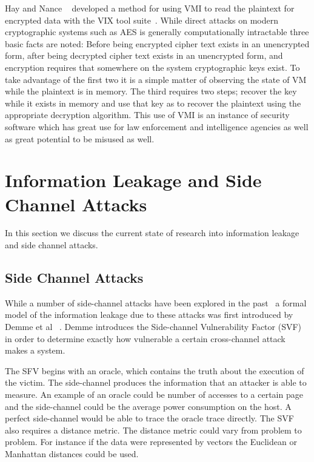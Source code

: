 Hay and Nance ~\cite{hay_circumventing_2012} developed a method for using VMI to read the plaintext for encrypted data with the VIX tool suite~\cite{hay_forensics_2008}.  While direct attacks on modern cryptographic systems such as AES is generally computationally intractable three basic facts are noted: Before being encrypted cipher text exists in an unencrypted form, after being decrypted cipher text exists in an unencrypted form, and encryption requires that somewhere on the system cryptographic keys exist. To take advantage of the first two it is a simple matter of observing the state of VM while the plaintext is in memory.  The third requires two steps; recover the key while it exists in memory and use that key as to recover the plaintext using the appropriate decryption algorithm. This use of VMI is an instance of security software which has great use for law enforcement and intelligence agencies as well as great potential to be misused as well.

\section{Information Leakage and Side Channel Attacks}

In this section we discuss the current state of research into information leakage and side channel attacks.

\subsection{Side Channel Attacks}
While a number of side-channel attacks have been explored in the past~\cite{yu_approach_2013,ristenpart_hey_2009, zhang_cross-vm_2012} a formal model of the information leakage due to these attacks was first introduced by Demme et al ~\cite{demme2012side}. Demme introduces the Side-channel Vulnerability Factor (SVF) in order to determine exactly how vulnerable a certain cross-channel attack makes a system. 

The SFV begins with an oracle, which contains the truth about the execution of the victim. The side-channel produces the information that an attacker is able to measure. An example of an oracle could be number of accesses to a certain page and the side-channel could be the average power consumption on the host. A perfect side-channel would be able to trace the oracle trace directly. The SVF also requires a distance metric. The distance metric could vary from problem to problem. For instance if the data were represented by vectors the Euclidean or Manhattan distances could be used. 



